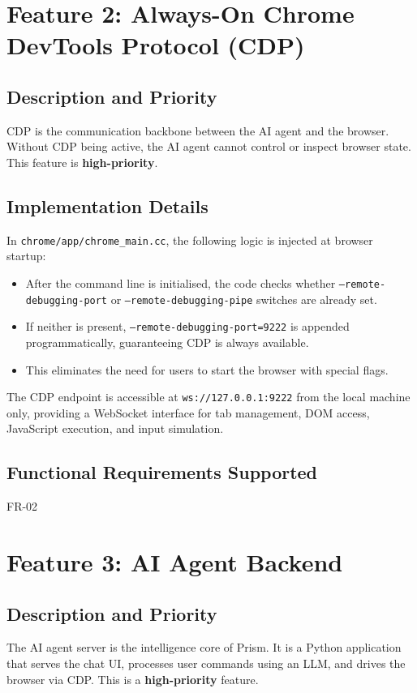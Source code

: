 \section{Feature 2: Always-On Chrome DevTools Protocol (CDP)}

\subsection{Description and Priority}
CDP is the communication backbone between the AI agent and the browser. Without CDP being active, the AI agent cannot control or inspect browser state. This feature is \textbf{high-priority}.

\subsection{Implementation Details}
In \texttt{chrome/app/chrome\_main.cc}, the following logic is injected at browser startup:
\begin{itemize}[leftmargin=*]
    \item After the command line is initialised, the code checks whether \texttt{--remote-debugging-port} or \texttt{--remote-debugging-pipe} switches are already set.
    \item If neither is present, \texttt{--remote-debugging-port=9222} is appended programmatically, guaranteeing CDP is always available.
    \item This eliminates the need for users to start the browser with special flags.
\end{itemize}
The CDP endpoint is accessible at \texttt{ws://127.0.0.1:9222} from the local machine only, providing a WebSocket interface for tab management, DOM access, JavaScript execution, and input simulation.

\subsection{Functional Requirements Supported}
FR-02

\section{Feature 3: AI Agent Backend}

\subsection{Description and Priority}
The AI agent server is the intelligence core of Prism. It is a Python application that serves the chat UI, processes user commands using an LLM, and drives the browser via CDP. This is a \textbf{high-priority} feature.

